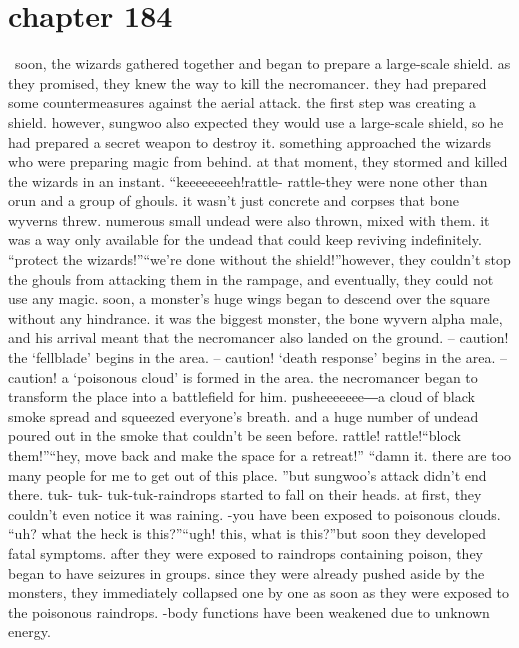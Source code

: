 \section{chapter 184}






 soon, the wizards gathered together and began to prepare a large-scale shield.
 as they promised, they knew the way to kill the necromancer.
 they had prepared some countermeasures against the aerial attack.
 the first step was creating a shield.
however, sungwoo also expected they would use a large-scale shield, so he had prepared a secret weapon to destroy it.
something approached the wizards who were preparing magic from behind.
at that moment, they stormed and killed the wizards in an instant.
“keeeeeeeeh!rattle- rattle-they were none other than orun and a group of ghouls.
it wasn’t just concrete and corpses that bone wyverns threw.
 numerous small undead were also thrown, mixed with them.
 it was a way only available for the undead that could keep reviving indefinitely.
“protect the wizards!”“we’re done without the shield!”however, they couldn’t stop the ghouls from attacking them in the rampage, and eventually, they could not use any magic.
soon, a monster’s huge wings began to descend over the square without any hindrance.
it was the biggest monster, the bone wyvern alpha male, and his arrival meant that the necromancer also landed on the ground.
– caution! the ‘fellblade’ begins in the area.
– caution! ‘death response’ begins in the area.
– caution! a ‘poisonous cloud’ is formed in the area.
the necromancer began to transform the place into a battlefield for him.
pusheeeeeee―a cloud of black smoke spread and squeezed everyone’s breath.
 and a huge number of undead poured out in the smoke that couldn’t be seen before.
rattle! rattle!“block them!”“hey, move back and make the space for a retreat!”
“damn it.
 there are too many people for me to get out of this place.
”but sungwoo’s attack didn’t end there.
tuk- tuk- tuk-tuk-raindrops started to fall on their heads.
 at first, they couldn’t even notice it was raining.
-you have been exposed to poisonous clouds.
“uh? what the heck is this?”“ugh! this, what is this?”but soon they developed fatal symptoms.
 after they were exposed to raindrops containing poison, they began to have seizures in groups.
since they were already pushed aside by the monsters, they immediately collapsed one by one as soon as they were exposed to the poisonous raindrops.
-body functions have been weakened due to unknown energy.
